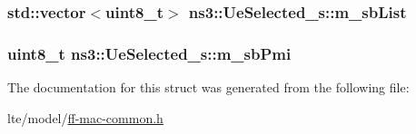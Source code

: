 \subsubsection[{\texorpdfstring{m\+\_\+sb\+List}{m_sbList}}]{\setlength{\rightskip}{0pt plus 5cm}std\+::vector$<$uint8\+\_\+t$>$ ns3\+::\+Ue\+Selected\+\_\+s\+::m\+\_\+sb\+List}\hypertarget{structns3_1_1UeSelected__s_a34bbedfcad9497603397fbe297c27fbc}{}\label{structns3_1_1UeSelected__s_a34bbedfcad9497603397fbe297c27fbc}
\subsubsection[{\texorpdfstring{m\+\_\+sb\+Pmi}{m_sbPmi}}]{\setlength{\rightskip}{0pt plus 5cm}uint8\+\_\+t ns3\+::\+Ue\+Selected\+\_\+s\+::m\+\_\+sb\+Pmi}\hypertarget{structns3_1_1UeSelected__s_a983b6e93c019fee548d854edb2e9889c}{}\label{structns3_1_1UeSelected__s_a983b6e93c019fee548d854edb2e9889c}


The documentation for this struct was generated from the following file\+:\begin{DoxyCompactItemize}
\item 
lte/model/\hyperlink{ff-mac-common_8h}{ff-\/mac-\/common.\+h}\end{DoxyCompactItemize}

